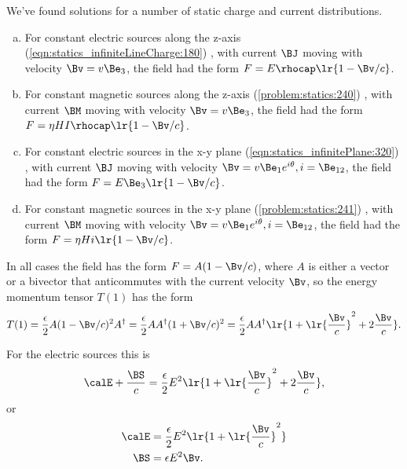 %
%

We've found solutions for a number of static charge and current distributions.

\begin{enumerate}[(a)]
\item For constant electric sources along the z-axis
(\cref{eqn:statics_infiniteLineCharge:180})
, with current \( \BJ \) moving with velocity \( \Bv = v \Be_3 \), the field had the form \( F = E \rhocap \lr{ 1 - \Bv/c } \).
\item For constant magnetic sources along the z-axis
(\cref{problem:statics:240})
, with current \( \BM \) moving with velocity \( \Bv = v \Be_3 \), the field had the form \( F = \eta H I \rhocap \lr{ 1 - \Bv/c } \).
\item For constant electric sources in the x-y plane
(\cref{eqn:statics_infinitePlane:320})
, with current \( \BJ \) moving with velocity \( \Bv = v \Be_1 e^{i\theta}, i = \Be_{12} \), the field had the form \( F = E \Be_3 \lr{ 1 - \Bv/c } \).
\item For constant magnetic sources in the x-y plane
(\cref{problem:statics:241})
, with current \( \BM \) moving with velocity \( \Bv = v \Be_1 e^{i\theta}, i = \Be_{12} \), the field had the form \( F = \eta H i \lr{ 1 - \Bv/c } \).
\end{enumerate}

In all cases the field has the form \( F = A ( 1 - \Bv/c ) \), where \( A \) is either a vector or a bivector that anticommutes with the current velocity \( \Bv \), so the energy momentum tensor \( T(1) \) has the form
\begin{dmath}\label{eqn:poyntingStaticExamples:860}
T(1)
= \frac{\epsilon}{2} A ( 1 - \Bv/c )^2 A^\dagger
= \frac{\epsilon}{2} A A^\dagger ( 1 + \Bv/c )^2
= \frac{\epsilon}{2} A A^\dagger \lr{ 1 + \lr{ \frac{\Bv}{c} }^2 + 2 \frac{\Bv}{c} }.
\end{dmath}

For the electric sources this is
\begin{equation}\label{eqn:poyntingStaticExamples:880}
\calE + \frac{\BS}{c} = \frac{\epsilon}{2} E^2 \lr{ 1 + \lr{ \frac{\Bv}{c} }^2 + 2 \frac{\Bv}{c} },
\end{equation}
or
\begin{equation}\label{eqn:poyntingStaticExamples:900}
\begin{aligned}
\calE &= \frac{\epsilon}{2} E^2 \lr{ 1 + \lr{ \frac{\Bv}{c} }^2 } \\
\BS &= \epsilon E^2 \Bv.
\end{aligned}
\end{equation}

